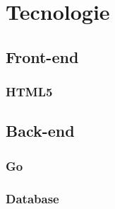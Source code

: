 \section{Tecnologie}


\subsection{Front-end}

\subsubsection{HTML5}

\subsection{Back-end}

\subsubsection{Go}

\subsubsection{Database}
